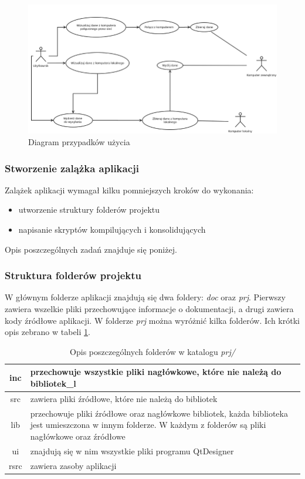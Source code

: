 \documentclass[a4paper]{article}
\begin{document}
\begin{figure}[h]
	\centering
	\includegraphics[width=0.75\paperheight, angle=90]{img/diagramPrzypadkowUzycia.png}
	\caption{Diagram przypadków użycia}
	\label{diagram_przypadkow_uzycia}
\end{figure}

\subsubsection{Stworzenie zalążka aplikacji}

Zalążek aplikacji wymagał kilku pomniejszych kroków do wykonania:
\begin{itemize}
	\item utworzenie struktury folderów projektu
	\item napisanie skryptów kompilujących i konsolidujących
\end{itemize}
Opis poszczególnych zadań znajduje się poniżej.

\subsubsection{Struktura folderów projektu}
W głównym folderze aplikacji znajdują się dwa foldery: \textit{doc} oraz \textit{prj}. Pierwszy zawiera wszelkie pliki przechowujące informacje o dokumentacji, a drugi zawiera kody źródłowe aplikacji. W folderze \textit{prj} można wyróżnić kilka folderów. Ich krótki opis zebrano w tabeli \ref{opis_folderow_prj}.

\begin{table}
\centering
\begin{tabularx}{0.7\linewidth}{|c|X|}
	\hline
	inc & przechowuje wszystkie pliki nagłówkowe, które nie należą do bibliotek\_l \\ \hline
	src & zawiera pliki źródłowe, które nie należą do bibliotek \\ \hline
	lib & przechowuje pliki źródłowe oraz nagłówkowe bibliotek, każda biblioteka jest umieszczona 
		  w innym folderze. W każdym z folderów są pliki nagłówkowe oraz źródłowe \\ \hline
	ui & znajdują się w nim wszystkie pliki  programu QtDesigner \\ \hline
	rsrc  & zawiera zasoby aplikacji \\ \hline
\end{tabularx}
\caption{Opis poszczególnych folderów w katalogu \textit{prj/}}
\label{opis_folderow_prj}
\end{table}
\end{document}
